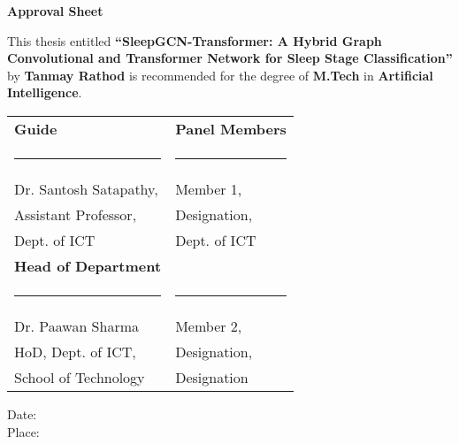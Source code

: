 \begin{center}
	\textbf{\large Approval Sheet}
\end{center}

This thesis entitled \textbf{\enquote{SleepGCN-Transformer: A Hybrid Graph Convolutional and Transformer Network for Sleep Stage Classification}} by \textbf{Tanmay Rathod} is recommended for the degree of \textbf{M.Tech} in \textbf{Artificial Intelligence}.

\vspace{1cm}

\begin{table}[h!]
	\centering
	\begin{tabular}{@{}m{}<{\centering} m{}<{\centering}@{}}
		\textbf{Guide} & \textbf{Panel Members} \\[4em]
		\rule{0.4\textwidth}{0.4pt} & \rule{0.4\textwidth}{0.4pt} \\[1em]
		Dr. Santosh Satapathy, & Member 1, \\[1em]
		Assistant Professor, & Designation, \\[1em]
		Dept. of ICT & Dept. of ICT \\[2em]
		\textbf{Head of Department} & \\ [4em]
		\rule{0.4\textwidth}{0.4pt} & \rule{0.4\textwidth}{0.4pt} \\[1em]
		Dr. Paawan Sharma & Member 2, \\[1em]
		HoD, Dept. of ICT, & Designation,\\[1em]
		School of Technology & Designation\\[1em]
	\end{tabular}
\end{table}

\vfill
\begin{flushleft}
	Date: \makebox[1.8in]{\hrulefill}\\
	Place: \makebox[1.8in]{\hrulefill}\\    
\end{flushleft}
